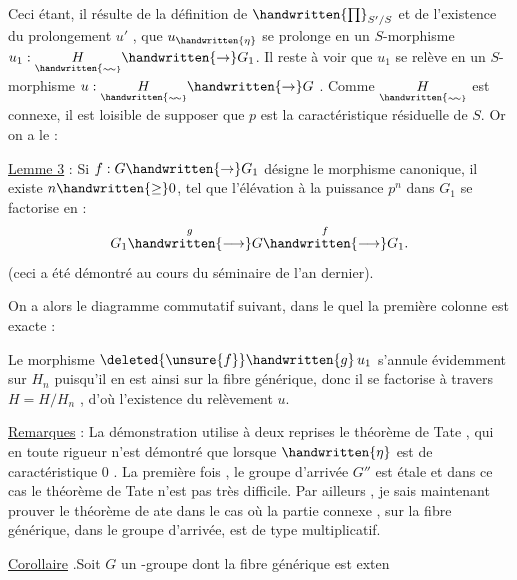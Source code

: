 Ceci étant, il résulte de la définition de $\handwritten{\prod}_{S'/S}$ et de l'existence du
prolongement $u'$ , que $u_{\handwritten{\eta}}$ se prolonge en un $S$-morphisme $u_1:\underset{\handwritten{\scriptscriptstyle\sim\!\sim}}{H}\handwritten{\to}G_1$.
Il reste à voir que $u_1$ se relève en un $S$-morphisme $u:\underset{\handwritten{\scriptscriptstyle\sim\!\sim}}{H}\handwritten{\to}G$  . Comme $\underset{\handwritten{\scriptscriptstyle\sim\!\sim}}{H}$ est connexe, il est loisible de supposer que $p$ est la caractéristique
résiduelle de $S$. Or on a le :

\uline{Lemme 3} : Si $f:G\handwritten{\to}G_1$ désigne le morphisme canonique, il existe $n\handwritten{\geq}0$,
tel que l'élévation à la puissance $p^n$ dans $G_1$ se factorise en :
\[
G_1\overset{g}{\handwritten{\longrightarrow}}G\overset{f}{\handwritten{\longrightarrow}}G_1.
\]
(ceci a été démontré au cours du séminaire de l'an dernier).

On a alors le diagramme commutatif suivant, dans le quel la première
colonne est exacte :

Le morphisme $\deleted{\unsure{f}}\handwritten{g}\,u_1$ s'annule évidemment sur $H_n$ puisqu'il en est ainsi sur
la fibre générique, donc il se factorise à travers $H=H/H_n$ , d'où l'existence du relèvement $u$.

\uline{Remarques} : La démonstration utilise à deux reprises le théorème de Tate ,
qui en toute rigueur n'est démontré que lorsque $\handwritten{\eta}$ est de caractéristique
0 . La première fois , le groupe d'arrivée $G''$ est étale et dans ce cas le
théorème de Tate n'est pas très difficile. Par ailleurs , je sais maintenant
prouver le théorème de ate dans le cas où la partie connexe , sur la fibre
générique, dans le groupe d'arrivée, est de type multiplicatif.

\uline{Corollaire} .Soit $G$ un \inserted{$\handwritten{\eta}$}-groupe  dont la fibre générique est exten%
